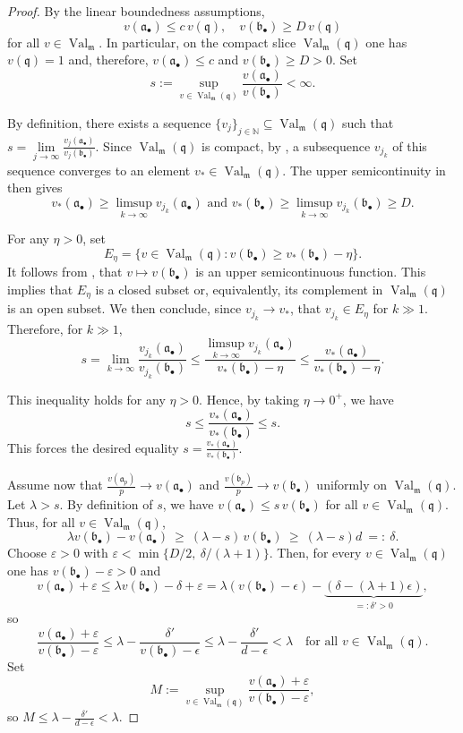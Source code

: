 \documentclass[12pt]{amsart}
\newcommand{\NN}{\mathbb{N}}
\newcommand{\m}{\mathfrak m}
\newcommand{\q}{\mathfrak q}
\renewcommand{\a}{\mathfrak{a}}
\renewcommand{\b}{\mathfrak{b}}
\DeclareMathOperator{\Val}{Val}
\newcommand{\abul}{{\a_\bullet}}
\newcommand{\bbul}{{\b_\bullet}}
\theoremstyle{plain}
\theoremstyle{definition}
\numberwithin{equation}{section}
\begin{document}
\begin{proof}
	By the linear boundedness assumptions,
	\[
	v(\abul)\le c\,v(\q),\quad v(\bbul)\ge D\,v(\q)
	\]
	for all $v\in\Val_{\m}$. In particular, on the compact slice $\Val_{\m}(\q)$ one has
	$v(\q)=1$ and, therefore, $v(\abul) \le c$ and $v(\bbul)\ge D >0$.
	Set
	\[
	s:=\sup_{v\in\Val_{\m}(\q)}\frac{v(\abul)}{v(\bbul)}<\infty.
	\]

By definition, there exists a sequence $\{v_j\}_{j \in \NN} \subseteq \Val_{\m}(\q)$ such that $s = \lim\limits_{j \rightarrow \infty} \frac{v_j(\abul)}{v_j(\bbul)}.$ Since $\Val_{\m}(\q)$ is compact, by , a subsequence $v_{j_k}$ of this sequence converges to an element $v_* \in \Val_{\m}(\q)$. The upper semicontinuity in  then gives
$$v_*(\abul) \ge \limsup_{k\rightarrow \infty} v_{j_k}(\abul) \text{ and } v_*(\bbul) \ge \limsup_{k \rightarrow \infty} v_{j_k}(\bbul) \ge D.$$

For any $\eta > 0$, set
$$E_\eta = \{v \in \Val_{\m}(\q) : v(\bbul) \ge v_*(\bbul) - \eta\}.$$
It follows from , that $v \mapsto v(\bbul)$ is an upper semicontinuous function. This implies that $E_\eta$ is a closed subset or, equivalently, its complement in $\Val_{\m}(\q)$ is an open subset. We then conclude, since $v_{j_k} \longrightarrow v_*$, that $v_{j_k} \in E_\eta$ for $k \gg 1$. Therefore, for $k \gg 1$, 
$$s = \lim_{k \rightarrow \infty} \frac{v_{j_k}(\abul)}{v_{j_k}(\bbul)} \le \frac{\limsup_{k \rightarrow \infty} v_{j_k}(\abul)}{v_*(\bbul) - \eta} \le \frac{v_*(\abul)}{v_*(\bbul)-\eta}.$$

This inequality holds for any $\eta > 0$. Hence, by taking $\eta \rightarrow 0^+$, we have 
$$s \le \frac{v_*(\abul)}{v_*(\bbul)} \le s.$$
This forces the desired equality $s = \frac{v_*(\abul)}{v_*(\bbul)}.$

	Assume now that $\frac{v(\a_p)}{p}\to v(\abul)$ and $\frac{v(\b_p)}{p}\to v(\bbul)$ uniformly on
	$\Val_{\m}(\q)$. Let $\lambda>s$. By definition of $s$, we have
	$v(\abul)\le s\,v(\bbul)$ for all $v\in\Val_{\m}(\q)$.
	Thus, for all $v\in\Val_{\m}(\q)$,
	\[
	\lambda v(\bbul)-v(\abul)\ \ge\ (\lambda-s)\,v(\bbul)\ \ge\ (\lambda-s)d\ =:\ \delta.
	\]
	Choose $\varepsilon>0$ with $\varepsilon<\min\{D/2,\ \delta/(\lambda+1)\}$.
	Then, for every $v\in\Val_{\m}(\q)$ one has $v(\bbul)-\varepsilon>0$ and
	\[
	v(\abul)+\varepsilon\le \lambda v(\bbul)-\delta+\varepsilon
	= \lambda(v(\bbul)-\epsilon) - \underbrace{(\delta - (\lambda+1)\epsilon)}_{=:\delta' > 0},
	\]
	so
	\[
	\frac{v(\abul)+\varepsilon}{v(\bbul)-\varepsilon} \le \lambda - \frac{\delta'}{v(\bbul)-\epsilon} \le \lambda - \frac{\delta'}{d-\epsilon} <\lambda\quad\text{for all }v\in\Val_{\m}(\q).
	\]
	Set
	\[
	M:=\sup_{v\in\Val_{\m}(\q)}\frac{v(\abul)+\varepsilon}{v(\bbul)-\varepsilon},
	\]
	so $M \le \lambda - \frac{\delta'}{d-\epsilon} <\lambda$.


\end{proof}
\end{document}
